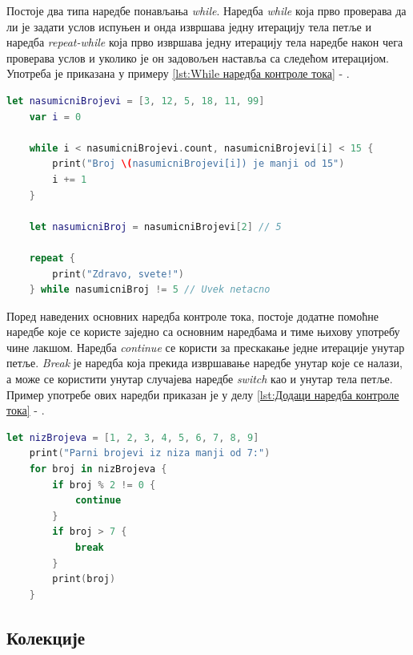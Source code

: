 \documentclass[12pt,oneside]{memoir}
\begin{document}
\indent Постоје два типа наредбе понављања \textit{while}. Наредба \textit{while} која прво проверава да ли је задати услов испуњен и онда извршава једну итерацију тела петље и наредба \textit{repeat-while} која прво извршава једну итерацију тела наредбе након чега проверава услов и уколико је он задовољен наставља са следећом итерацијом. Употреба је приказана у примеру \ref{lst:While наредба контроле тока} - . 

\begin{lstlisting}[caption=\textit{{While наредбa контроле тока}}, label={lst:While наредба контроле тока}, language=Swift, frame=single]
    let nasumicniBrojevi = [3, 12, 5, 18, 11, 99]
    var i = 0
    
    while i < nasumicniBrojevi.count, nasumicniBrojevi[i] < 15 {
        print("Broj \(nasumicniBrojevi[i]) je manji od 15")
        i += 1
    }
    
    let nasumicniBroj = nasumicniBrojevi[2] // 5
    
    repeat {
        print("Zdravo, svete!")
    } while nasumicniBroj != 5 // Uvek netacno
\end{lstlisting}

\indent Поред наведених основних наредба контроле тока, постоје додатне помоћне наредбе које се користе заједно са основним наредбама и тиме њихову употребу чине лакшом. Наредба \textit{continue} се користи за прескакање једне итерације унутар петље. \textit{Break} је наредба која прекида извршавање наредбе унутар које се налази, а може се користити унутар случајева наредбе \textit{switch} као и унутар тела петље. Пример употребе ових наредби приказан је у делу \ref{lst:Додаци наредба контроле тока} - .

\begin{lstlisting}[caption=\textit{{Додаци наредбa контроле тока}}, label={lst:Додаци наредба контроле тока}, language=Swift, frame=single]
    let nizBrojeva = [1, 2, 3, 4, 5, 6, 7, 8, 9]
    print("Parni brojevi iz niza manji od 7:")
    for broj in nizBrojeva {
        if broj % 2 != 0 {
            continue
        }
        if broj > 7 {
            break
        }
        print(broj)
    }
\end{lstlisting}

\subsection{Колекције}
\label{subsec:Колекције}
\end{document}
